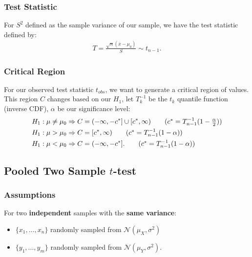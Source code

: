 \documentclass[a4paper, 12pt, twoside]{article}
\begin{document}
\subsubsection{Test Statistic}

For $S^2$ defined as the sample variance of our sample, we have
the test statistic defined by:
\begin{align*}
    T = \frac{\sqrt{n}(\overline{x} - \mu_0)}{S} \sim t_{n-1}.
\end{align*}

\subsubsection{Critical Region}

For our observed test statistic $t_{obs}$, we want to generate a
critical region of values. This region $C$ changes based on our
$H_1$, let $T_k^{-1}$ be the $t_k$ quantile function (inverse CDF),
$\alpha$ be our significance level:
\begin{align*}
    H_1 : \mu \neq \mu_0 & \Rightarrow
    C = (-\infty, -c^*] \cup [c^*, \infty)
    \tag{$ c^* = T^{-1}_{n-1}(1 - \frac{\alpha}{2}) $} \\
    H_1 : \mu > \mu_0    & \Rightarrow
    C = [c^*, \infty)
    \tag{$ c^* = T^{-1}_{n-1}(1 - \alpha) $}           \\
    H_1 : \mu < \mu_0    & \Rightarrow
    C = (-\infty, -c^*].
    \tag{$ c^* = T^{-1}_{n-1}(1 - \alpha) $}
\end{align*}

\newpage

\subsection{Pooled Two Sample $t$-test}

\subsubsection{Assumptions}

For two \textbf{independent} samples with the \textbf{same variance}:
\begin{itemize}
    \item $\{x_1, \ldots, x_n\}$ randomly sampled from
          $\mathcal{N}(\mu_X, \sigma^2)$
    \item $\{y_1, \ldots, y_m\}$
          randomly sampled from $\mathcal{N}(\mu_Y, \sigma^2)$.
\end{itemize}
\end{document}
